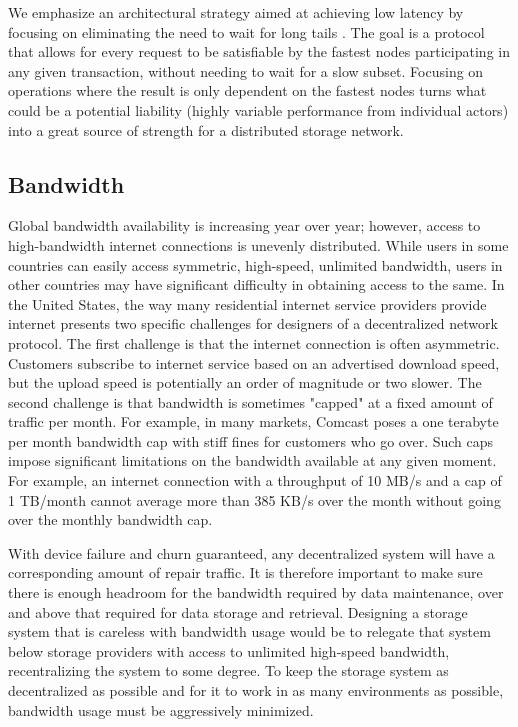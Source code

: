 \documentclass[a4paper,10pt]{article} \usepackage[utf8]{inputenc}
\begin{document}
We emphasize an architectural strategy aimed at achieving low latency by
focusing on eliminating the need to wait for long tails \cite{tail-at-scale}. 
The goal is a protocol that allows for every request to be satisfiable by the
fastest nodes participating in any given transaction, without needing to wait 
for a slow subset. 
Focusing on operations where the result is only dependent on the fastest
nodes turns what could be a potential liability (highly variable performance
from individual actors) into a great source of strength for a distributed
storage network.

\subsection{Bandwidth}

Global bandwidth availability is increasing year over year; however, access to
high-bandwidth internet connections is unevenly distributed. While users in some
countries can easily access symmetric, high-speed, unlimited bandwidth, users in
other countries may have significant difficulty in obtaining access to the same.
In the United States, the way many residential internet service providers provide
internet presents two specific challenges for designers of a
decentralized network protocol. The first challenge is that the internet
connection is often asymmetric. Customers subscribe to internet service
based on an advertised download speed, but the upload speed is potentially an
order of magnitude or two slower. The second challenge is that bandwidth is
sometimes "capped" at a fixed amount of traffic per month. For example, in many
markets, Comcast poses a one terabyte per month bandwidth cap with stiff fines
for customers who go over. Such caps impose
significant limitations on the bandwidth available at any given moment.
For example,
an internet connection with a throughput of 10 MB/s and a cap of 1
TB/month cannot average more than 385 KB/s over the month without going
over the monthly bandwidth cap.

With device failure and churn guaranteed, any decentralized system will have a
corresponding amount of repair traffic. It is therefore important to make sure
there is enough headroom for the bandwidth required by data maintenance, over
and above that required for data storage and retrieval. Designing a
storage system that is careless with bandwidth usage would be to relegate that
system below storage providers with access to unlimited high-speed bandwidth,
recentralizing the system to some degree. To keep the storage system as
decentralized as possible and for it to work in as many environments as
possible, bandwidth usage must be aggressively minimized.
\end{document}
